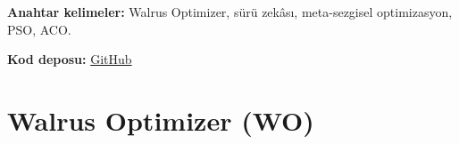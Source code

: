 \documentclass[11pt,a4paper]{article}
\begin{document}
    

    \newpage
    \begin{abstract}
    Bu çalışmada, Walrus Optimizer (WO) algoritmasının temel ilkeleri ve
    matematiksel modeli incelenmektedir. Algoritmanın arama mekanizmaları
    açıklanmakta ve WO, Particle Swarm Optimization (PSO) ile Ant Colony
    Optimization (ACO) yöntemleriyle karşılaştırılmaktadır.
    \end{abstract}

    \noindent\textbf{Anahtar kelimeler:}
    Walrus Optimizer, sürü zekâsı, meta-sezgisel optimizasyon, PSO, ACO.

    \noindent\textbf{Kod deposu:}
    \href{https://github.com/lmcasan/metaheuristic-algorithms}{GitHub}

    \newpage
    \setcounter{section}{2}
    \section{Walrus Optimizer (WO)}
        
        
        

    \newpage
    
\end{document}
